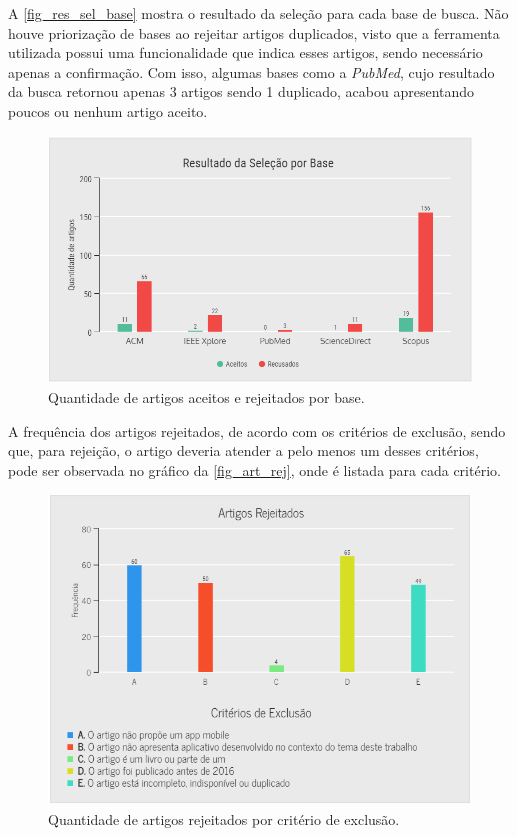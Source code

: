 A \autoref{fig_res_sel_base} mostra o resultado da seleção para cada base de busca. Não houve priorização de bases ao rejeitar artigos duplicados, visto que a ferramenta utilizada possui uma funcionalidade que indica esses artigos, sendo necessário apenas a confirmação. Com isso, algumas bases como a \emph{PubMed}, cujo resultado da busca retornou apenas 3 artigos sendo 1 duplicado, acabou apresentando poucos ou nenhum artigo aceito.

\begin{figure}[htb]
	\caption{\label{fig_res_sel_base}Quantidade de artigos aceitos e rejeitados por base.}
	\begin{center}
	    \includegraphics[scale=0.6]{Imagens/msl/resultado_selecao_base.png}
	\end{center}
\end{figure}

\newpage

A frequência dos artigos rejeitados, de acordo com os critérios de exclusão, sendo que, para rejeição, o artigo deveria atender a pelo menos um desses critérios, pode ser observada no gráfico da \autoref{fig_art_rej}, onde é listada para cada critério.

\begin{figure}[htb]
	\caption{\label{fig_art_rej}Quantidade de artigos rejeitados por critério de exclusão.}
	\begin{center}
	    \includegraphics[scale=0.6]{Imagens/msl/artigos_rejeitados.png}
	\end{center}
\end{figure}


